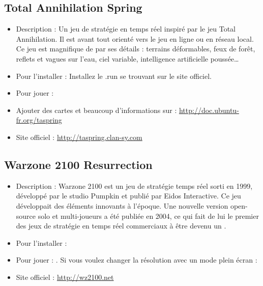 \subsection{Total Annihilation Spring}
\begin{itemize}
\begingroup
{}
\item Description : Un jeu de stratégie en temps réel inspiré par le jeu Total Annihilation. Il est avant tout orienté vers le jeu en ligne ou en réseau local. Ce jeu est magnifique de par ses détails : terrains déformables, feux de forêt, reflets et vagues sur l'eau, ciel variable, intelligence artificielle poussée\ldots{}{\par}
\endgroup
\item Pour l'installer : Installez le .run se trouvant sur le site officiel.{\par}
\item Pour jouer : 
\item Ajouter des cartes et beaucoup d'informations sur : \url{http://doc.ubuntu-fr.org/taspring}{\par}
\item Site officiel : \url{http://taspring.clan-sy.com}{\par}
\end{itemize}
\subsection{Warzone 2100 Resurrection}
\begin{itemize}
\begingroup
{}
\item Description : Warzone 2100 est un jeu de stratégie temps réel sorti en 1999, développé par le studio Pumpkin et publié par Eidos Interactive. Ce jeu développait des éléments innovants à l'époque.  Une nouvelle version open-source solo et multi-joueurs a été publiée en 2004, ce qui fait de lui le premier des jeux de stratégie en temps réel commerciaux à être devenu un .{\par}
\endgroup
\item Pour l'installer : 
\item Pour jouer : . Si vous voulez changer la résolution avec un mode plein écran : 
\item Site officiel : \url{http://wz2100.net}{\par}
\end{itemize}
